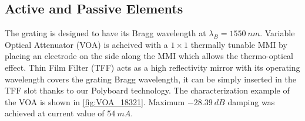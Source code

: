 \subsection{Active and Passive Elements}
The grating is designed to have its Bragg wavelength at $\lambda_B=1550 \ nm$.  Variable Optical Attenuator (VOA) is acheived with a $1\times 1$  thermally tunable MMI by placing an electrode on the side along the MMI which allows the thermo-optical effect. Thin Film Filter (TFF) acts as a high reflectivity mirror with its operating wavelength covers the grating Bragg wavelength, it can be simply inserted in the TFF slot thanks to our Polyboard technology. The characterization example of the VOA is shown in \autoref{fig:VOA_18321}. Maximum $-28.39 \ dB$ damping was achieved at current value of $54 \ mA$. 

